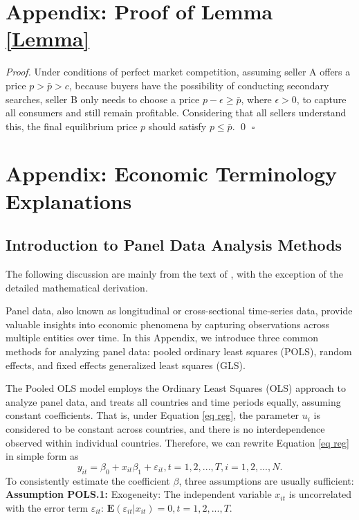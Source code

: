 \documentclass[ %
    final,
    scrbook,
    listoffigures,
    listoftables, 
    glossary]{cu-thesis}
\newenvironment{proof}[1][Proof]{\par\noindent\textit{#1.} }{\hfill $\square$\par}
\begin{document}
\appendix
\setcounter{section}{0}
\renewcommand{\thesection}{\Alph{section}}
\section{Appendix: Proof of Lemma \ref{Lemma}}
\begin{proof}
Under conditions of perfect market competition, assuming seller A offers a price $p>\bar{p}>c$, because buyers have the possibility of conducting secondary searches, seller B only needs to choose a price 
$p-\epsilon\geq\bar{p}$, where $\epsilon>0$, to capture all consumers and still remain profitable. Considering that all sellers understand this, the final equilibrium price $p$ should satisfy $p\leq\bar{p}$.
\qed
\end{proof}
\section{Appendix: Economic Terminology Explanations}
\subsection{Introduction to Panel Data Analysis Methods}
The following discussion are mainly from the text of \cite{wooldridge2010econometric}, with the exception of the detailed mathematical derivation.

Panel data, also known as longitudinal or cross-sectional time-series data, provide valuable insights into economic phenomena by capturing observations across multiple entities over time. In this Appendix, we introduce three common methods for analyzing panel data: pooled ordinary least squares (POLS), random effects, and fixed effects generalized least squares (GLS).

The Pooled OLS model employs the Ordinary Least Squares (OLS) approach to analyze panel data, and treats all countries and time periods equally, assuming constant coefficients. That is, under Equation \ref{eq reg}, the parameter $u_i$ is considered to be constant across countries, and there is no interdependence observed within individual countries. Therefore, we can rewrite Equation \ref{eq reg} in simple form as 
\begin{equation} \label{eq simple reg}
y_{it}=\beta_{0}+x_{it}\beta_{1}+\varepsilon_{it}, t = 1,2, ..., T, i = 1, 2, ..., N.
\end{equation}
To consistently estimate the coefficient $\beta$, three assumptions are usually sufficient:\\
\noindent \textbf{Assumption POLS.1:} Exogeneity: The independent variable $x_{it}$ is uncorrelated with the error term $\varepsilon_{it}$:
$\textbf{E}(\varepsilon_{it}|x_{it})=0,  t = 1,2, ..., T.$
\end{document}

